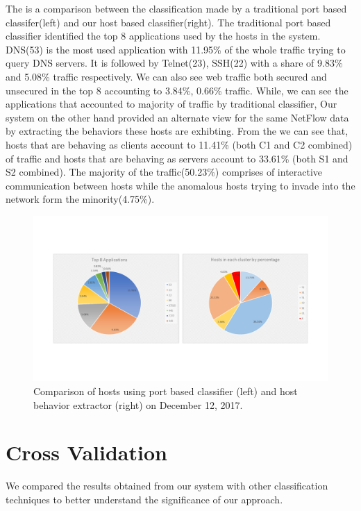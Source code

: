 The  is a comparison between the classification made by a traditional port based classifer(left) and our host based classifier(right). The traditional port based classifier identified the top 8 applications used by the hosts in the system. DNS(53) is the most used application with 11.95\% of the whole traffic trying to query DNS servers. It is followed by Telnet(23), SSH(22) with a share of 9.83\% and 5.08\% traffic respectively. We can also see web traffic both secured and unsecured in the top 8 accounting to 3.84\%, 0.66\% traffic. While, we can see the applications that accounted to majority of traffic by traditional classifier, Our system on the other hand provided an alternate view for the same NetFlow data by extracting the behaviors these hosts are exhibting. From the  we can see that, hosts that are behaving as clients account to 11.41\% (both C1 and C2 combined) of traffic and hosts that are behaving as servers account to 33.61\% (both S1 and S2 combined). The majority of the traffic(50.23\%) comprises of interactive communication between hosts while the anomalous hosts trying to invade into the network form the minority(4.75\%). 

\begin{figure}[t]
	\centerline{\includegraphics[trim=2cm 2cm 2cm 2cm, scale = 0.5]{dec12-port-behaviors.pdf}}
	\caption{Comparison of hosts using port based classifier (left) and host behavior extractor (right) on December 12, 2017.}%
\end{figure}


\section{Cross Validation} \label{cross_validation}
We compared the results obtained from our system with other classification techniques to better understand the significance of our approach.

